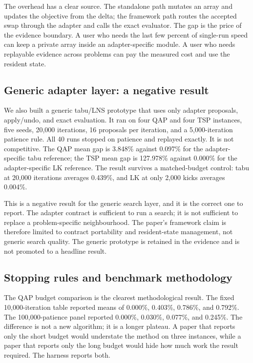 \documentclass[11pt]{article}
\begin{document}
The overhead has a clear source. The standalone path mutates an array and updates the objective from
the delta; the framework path routes the accepted swap through the adapter and calls the exact
evaluator. The gap is the price of the evidence boundary. A user who needs the last few percent of
single-run speed can keep a private array inside an adapter-specific module. A user who needs
replayable evidence across problems can pay the measured cost and use the resident state.

\subsection{Generic adapter layer: a negative result}

We also built a generic tabu/LNS prototype that uses only adapter proposals, apply/undo, and exact
evaluation. It ran on four QAP and four TSP instances, five seeds, 20,000 iterations, 16 proposals per
iteration, and a 5,000-iteration patience rule. All 40 runs stopped on patience and replayed exactly.
It is not competitive. The QAP mean gap is 3.848\% against 0.097\% for the adapter-specific tabu
reference; the TSP mean gap is 127.978\% against 0.000\% for the adapter-specific LK reference. The
result survives a matched-budget control: tabu at 20,000 iterations averages 0.439\%, and LK at only
2,000 kicks averages 0.004\%.

This is a negative result for the generic search layer, and it is the correct one to report. The
adapter contract is sufficient to run a search; it is not sufficient to replace a problem-specific
neighbourhood. The paper's framework claim is therefore limited to contract portability and
resident-state management, not generic search quality. The generic prototype is retained in the
evidence and is not promoted to a headline result.

\subsection{Stopping rules and benchmark methodology}

The QAP budget comparison is the clearest methodological result. The fixed 10,000-iteration table
reported means of 0.000\%, 0.403\%, 0.786\%, and 0.792\%. The 100,000-patience panel reported 0.000\%,
0.030\%, 0.077\%, and 0.245\%. The difference is not a new algorithm; it is a longer plateau. A paper
that reports only the short budget would understate the method on three instances, while a paper that
reports only the long budget would hide how much work the result required. The harness reports both.
\end{document}
